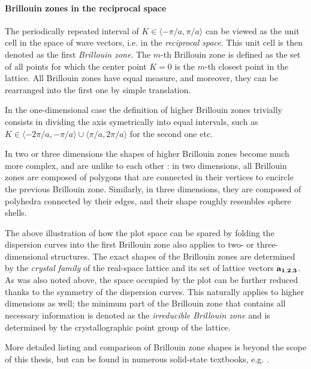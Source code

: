 \paragraph{Brillouin zones in the reciprocal space} %
The periodically repeated interval of $K\in\langle-\pi/a, \pi/a\rangle$ can be viewed as the unit cell in the space of wave vectors, i.e. in the \textit{reciprocal space}. This unit cell is then denoted as the first \textit{Brillouin zone}. 
The $m$-th Brillouin zone is defined as the set of all points for which the center point $K=0$ is the $m$-th closest point in the lattice. 
All Brillouin zones have equal measure, and moreover, they can be rearranged into the first one by simple translation. %

In the one-dimensional case the definition of higher Brillouin zones trivially consists in dividing the axis symetrically into equal intervals, such as $K\in\langle-2\pi/a, -\pi/a\rangle \cup \langle \pi/a, 2\pi/a\rangle$ for the second one etc. 

In two or three dimensions the shapes of higher Brillouin zones become much more complex, and are unlike to each other \cite[pp. 134--135]{klingshirn2007semiconductor}: in two dimensions, all Brillouin zones are composed of polygons that are connected in their vertices to encircle the previous Brillouin zone. Similarly, in three dimensions, they are composed of polyhedra connected by their edges, and their shape roughly resembles sphere shells. 

The above illustration of how the plot space can be spared by folding the dispersion curves into the first Brillouin zone also applies to two- or three-dimensional structures.
The exact shapes of the Brillouin zones are determined by the \textit{crystal family} of the real-space lattice and its set of lattice vectors ${\mathbf{a_{1,2,3}}}$. 
As was also noted above, the space occupied by the plot can be further reduced thanks to the symmetry of the dispersion curves. This naturally applies to higher dimensions as well; the minimum part of the Brillouin zone that contains all necessary information is denoted as the \textit{irreducible Brillouin zone} and is determined by the crystallographic point group of the lattice. 

More detailed listing and comparison of Brillouin zone shapes is beyond the scope of this thesis, but can be found in numerous solid-state textbooks, e.g. \cite[pp. 96-99]{klingshirn2007semiconductor}. %

